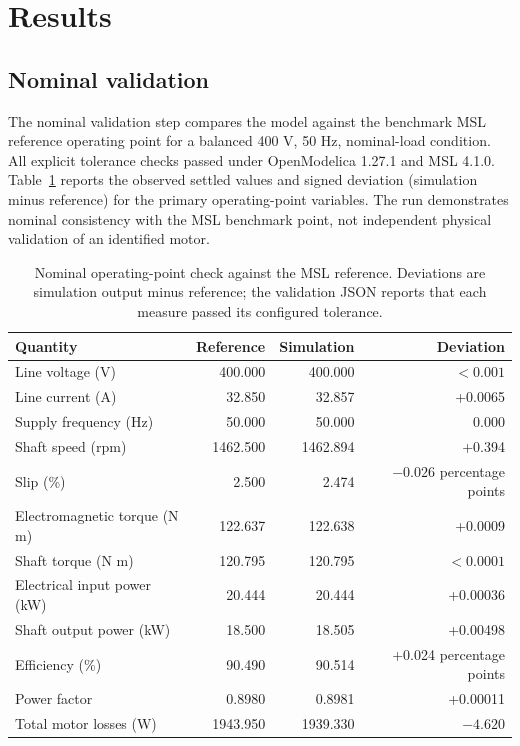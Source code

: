 \documentclass[machines,article,submit,moreauthors]{Definitions/mdpi}
\begin{document}
\section{Results}
\label{sec:results}

\subsection{Nominal validation}

The nominal validation step compares the model against the benchmark MSL reference operating point for a balanced 400 V, 50 Hz, nominal-load condition. All explicit tolerance checks passed under OpenModelica 1.27.1 and MSL 4.1.0. Table~\ref{tab:validation} reports the observed settled values and signed deviation (simulation minus reference) for the primary operating-point variables. The run demonstrates nominal consistency with the MSL benchmark point, not independent physical validation of an identified motor.

\begin{table}[H]
\caption{Nominal operating-point check against the MSL reference. Deviations are simulation output minus reference; the validation JSON reports that each measure passed its configured tolerance.\label{tab:validation}}
\begin{tabularx}{\textwidth}{l r r r}
\toprule
\textbf{Quantity} & \textbf{Reference} & \textbf{Simulation} & \textbf{Deviation} \\
\midrule
Line voltage (V) & 400.000 & 400.000 & $<0.001$ \\
Line current (A) & 32.850 & 32.857 & +0.0065 \\
Supply frequency (Hz) & 50.000 & 50.000 & 0.000 \\
Shaft speed (rpm) & 1462.500 & 1462.894 & +0.394 \\
Slip (\%) & 2.500 & 2.474 & $-0.026$ percentage points \\
Electromagnetic torque (N m) & 122.637 & 122.638 & +0.0009 \\
Shaft torque (N m) & 120.795 & 120.795 & $<0.0001$ \\
Electrical input power (kW) & 20.444 & 20.444 & +0.00036 \\
Shaft output power (kW) & 18.500 & 18.505 & +0.00498 \\
Efficiency (\%) & 90.490 & 90.514 & +0.024 percentage points \\
Power factor & 0.8980 & 0.8981 & +0.00011 \\
Total motor losses (W) & 1943.950 & 1939.330 & $-4.620$ \\
\bottomrule
\end{tabularx}
\end{table}
\end{document}
